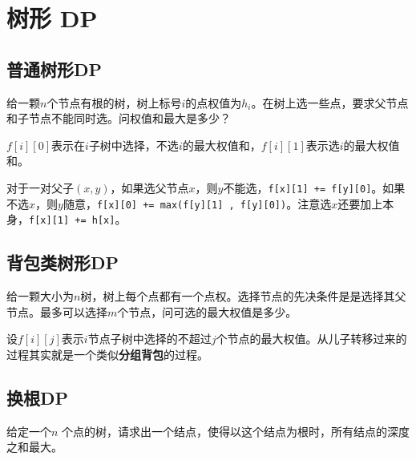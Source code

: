 \section{树形 DP}

\subsection{普通树形DP}


\begin{framed}
    给一颗$n$个节点有根的树，树上标号$i$的点权值为$h_i$。在树上选一些点，要求父节点和子节点不能同时选。问权值和最大是多少？
\end{framed}

$f[i][0]$表示在$i$子树中选择，不选$i$的最大权值和，$f[i][1]$表示选$i$的最大权值和。

对于一对父子$(x,y)$，如果选父节点$x$，则$y$不能选，\verb|f[x][1] += f[y][0]|。如果不选$x$，则$y$随意，\verb|f[x][0] += max(f[y][1] , f[y][0])|。注意选$x$还要加上本身，\verb|f[x][1] += h[x]|。



\subsection{背包类树形DP}

\begin{framed}
    给一颗大小为$n$树，树上每个点都有一个点权。选择节点的先决条件是是选择其父节点。最多可以选择$m$个节点，问可选的最大权值是多少。
\end{framed}

设$f[i][j]$表示$i$节点子树中选择的不超过$j$个节点的最大权值。从儿子转移过来的过程其实就是一个类似\textbf{分组背包}的过程。



\subsection{换根DP}

\begin{framed}
    给定一个$n$ 个点的树，请求出一个结点，使得以这个结点为根时，所有结点的深度之和最大。
\end{framed}



